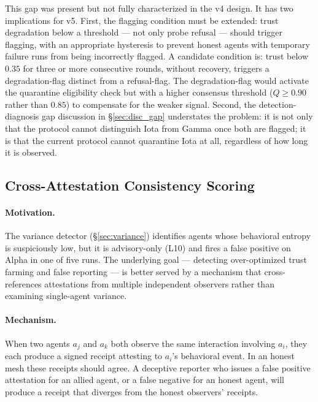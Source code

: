 This gap was present but not fully characterized in the v4 design.  It has two
implications for v5.  First, the flagging condition must be extended: trust degradation
below a threshold --- not only probe refusal --- should trigger flagging, with an
appropriate hysteresis to prevent honest agents with temporary failure runs from being
incorrectly flagged.  A candidate condition is: trust below $0.35$ for three or more
consecutive rounds, without recovery, triggers a degradation-flag distinct from a
refusal-flag.  The degradation-flag would activate the quarantine eligibility check
but with a higher consensus threshold ($Q \geq 0.90$ rather than $0.85$) to compensate
for the weaker signal.  Second, the detection-diagnosis gap discussion in
\S\ref{sec:disc_gap} understates the problem: it is not only that the protocol cannot
distinguish Iota from Gamma once both are flagged; it is that the current protocol
cannot quarantine Iota at all, regardless of how long it is observed.

\subsection{Cross-Attestation Consistency Scoring}
\label{sec:fw_crossattest}

\paragraph{Motivation.}
The variance detector (\S\ref{sec:variance}) identifies agents whose behavioral entropy
is suspiciously low, but it is advisory-only (L10) and fires a false positive on
Alpha in one of five runs.  The underlying goal --- detecting over-optimized trust
farming and false reporting --- is better served by a mechanism that cross-references
attestations from multiple independent observers rather than examining single-agent
variance.

\paragraph{Mechanism.}
When two agents $a_j$ and $a_k$ both observe the same interaction involving $a_i$,
they each produce a signed receipt attesting to $a_i$'s behavioral event.  In an
honest mesh these receipts should agree.  A deceptive reporter who issues a false
positive attestation for an allied agent, or a false negative for an honest agent,
will produce a receipt that diverges from the honest observers' receipts.

